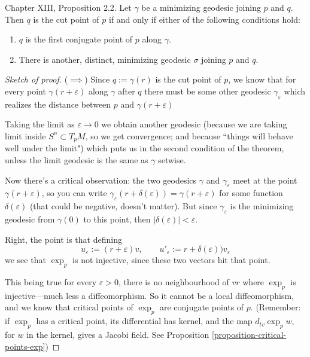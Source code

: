 \begin{proposition}
\label{proposition-cut-point-characterization}
\cite{doc} Chapter XIII, Proposition 2.2. Let $\gamma$ be a minimizing geodesic joining $p$ and $q$. Then $q$ is the cut
point of $p$ if and only if either of the following conditions hold:
\begin{enumerate}
\item $q$ is the first conjugate point of $p$ along $\gamma$.
\item There is another, distinct, minimizing geodesic $\sigma$ joining $p$ and
 $q$.
\end{enumerate}
\end{proposition}

\begin{proof}[Sketch of proof]
($\implies$) Since $q:=\gamma(r)$ is the cut point of $p$, we know that for every point
$\gamma(r+\varepsilon)$ along $\gamma$ after $q$ there must be some other geodesic
$\gamma_\varepsilon$ which realizes the distance between $p$ and
$\gamma(r+\varepsilon)$

Taking the limit as $\varepsilon \to 0$ we obtain another geodesic
(because we are taking limit inside $S^n \subset T_pM$, so we get convergence;
and because ``things will behave well under the limit")
which puts us in the second condition of the theorem,
unless the limit geodesic is the same as  $\gamma$ setwise.

Now there's a critical observation:
the two geodesics $\gamma$ and $\gamma_\varepsilon$ meet at the point 
 $\gamma(r+\varepsilon)$, so you can write
 $\gamma_\varepsilon(r+\delta(\varepsilon))=\gamma(r+\varepsilon)$
 for some function $\delta(\varepsilon)$ (that could be negative, doesn't
 matter).
 But since $\gamma_\varepsilon$ is the minimizing
 geodesic from $\gamma(0)$ to this point, then
 $|\delta(\varepsilon)|<\varepsilon$.

Right, the point is that defining
$$
u_\varepsilon:=(r+\varepsilon)v,\qquad
u'_\varepsilon:=r+\delta(\varepsilon))v_\varepsilon
$$
we see that $\operatorname{exp}_p$ is not injective, since these two vectors
hit that point.

This being true for every $\varepsilon>0$, there is no neighbourhood of $vr$ 
where $\operatorname{exp}_p$ is injective---much less a diffeomorphism.
So it cannot be a local diffeomorphism, and we know that critical points of
$\operatorname{exp}_p$ are conjugate points of $p$. (Remember: if
$\operatorname{exp}_p$ has a critical point, its differential has kernel,
and the map $d_{tv}\operatorname{exp}_pw$, for $w$ in the kernel, gives 
a Jacobi field. See Proposition \ref{proposition-critical-points-exp})
\end{proof}

